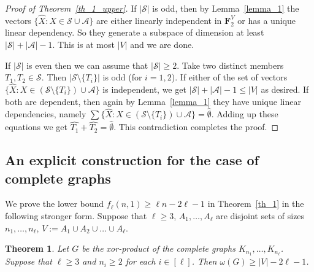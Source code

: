 \documentclass[12pt,a4paper]{amsart}
\numberwithin{equation}{section}
\theoremstyle{plain}
\newtheorem{Th}{Theorem}[section]
\theoremstyle{definition}
\newcommand{\NN}{n}
\def\vec#1{\widehat{#1}}
\def\bbF{{\mathbf F}}
\def\cA{{\mathcal{A}}}
\def\cS{{\mathcal{S}}}
\begin{document}
\begin{proof}[Proof of Theorem~\ref{th_1_upper}]
If $|\cS|$ is odd, then by Lemma~\ref{lemma_1}  the vectors $\{ \vec{X}: X\in \cS\cup \cA\}$ are either linearly independent in $\bbF_2^V$ or has a unique linear dependency. So they generate a subspace of dimension at least $|\cS|+|\cA|-1$. This is at most $|V|$ and we are done.

If $|\cS|$ is even then we can assume that $|\cS|\geq 2$. Take two distinct members $T_1, T_2\in \cS$.
Then $|\cS\setminus \{ T_i\}|$ is odd (for $i=1,2$). If either of the set of vectors $\{ \vec{X}: X\in (\cS\setminus \{ T_i\})\cup \cA\}$ is independent, we get $|\cS|+|\cA|-1\leq |V|$ as desired.
If both are dependent, then again by Lemma~\ref{lemma_1} they have unique linear dependencies, namely
  $\sum \{ \vec{X}: X\in (\cS\setminus \{ T_i\})\cup \cA\}=\vec{\emptyset}$.
Adding up these equations we get $\vec{T_1}+\vec{T_2}= \vec{\emptyset}$. This contradiction completes the proof.
\end{proof}




\subsection{An explicit construction for the case of complete graphs}\label{sscompletes_lower}


We prove the lower bound  $f_\ell(\NN,1)\geq \ell \NN -2\ell-1$ in Theorem~\ref{th_1} in the following stronger form.
Suppose that $\ell\geq 3$, $A_1, \dots, A_\ell$ are disjoint sets
 of sizes $n_1, \dots, n_\ell$, $V:=A_1 \cup A_2 \cup \ldots \cup A_\ell $.

\begin{Th}\label{th_1_lower}
Let $G$ be the xor-product of the complete graphs $K_{n_1}, \dots, K_{n_\ell}$.
Suppose that $\ell\geq 3$ and $n_i\geq 2$ for each $i\in [\ell]$.
Then $\omega(G)\geq |V|-2\ell-1$.
\end{Th}
\end{document}

